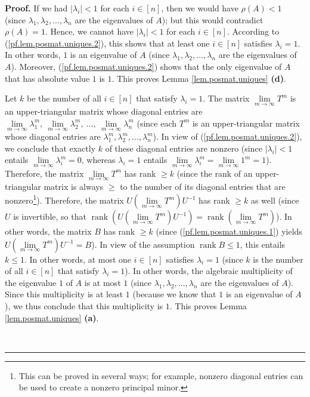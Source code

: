 \documentclass[numbers=enddot,12pt,final,onecolumn,notitlepage]{scrartcl}%
\numberwithin{exer}{subsection}
\theoremstyle{definition}
\newenvironment{proof}[1][Proof]{\noindent\textbf{#1.} }{\ \rule{0.5em}{0.5em}}
\begin{document}
\begin{proof}
If we had $\left\vert \lambda_{i}\right\vert <1$ for each $i\in\left[
n\right]  $, then we would have $\rho\left(  A\right)  <1$ (since $\lambda
_{1},\lambda_{2},\ldots,\lambda_{n}$ are the eigenvalues of $A$); but this
would contradict $\rho\left(  A\right)  =1$. Hence, we cannot have $\left\vert
\lambda_{i}\right\vert <1$ for each $i\in\left[  n\right]  $. According to
(\ref{pf.lem.posmat.uniques.2}), this shows that at least one $i\in\left[
n\right]  $ satisfies $\lambda_{i}=1$. In other words, $1$ is an eigenvalue of
$A$ (since $\lambda_{1},\lambda_{2},\ldots,\lambda_{n}$ are the eigenvalues of
$A$). Moreover, (\ref{pf.lem.posmat.uniques.2}) shows that the only eigenvalue
of $A$ that has absolute value $1$ is $1$. This proves Lemma
\ref{lem.posmat.uniques} \textbf{(d)}.

Let $k$ be the number of all $i\in\left[  n\right]  $ that satisfy
$\lambda_{i}=1$. The matrix $\lim\limits_{m\rightarrow\infty}T^{m}$ is an
upper-triangular matrix whose diagonal entries are $\lim\limits_{m\rightarrow
\infty}\lambda_{1}^{m},\ \lim\limits_{m\rightarrow\infty}\lambda_{2}%
^{m},\ \ldots,\ \lim\limits_{m\rightarrow\infty}\lambda_{n}^{m}$ (since each
$T^{m}$ is an upper-triangular matrix whose diagonal entries are $\lambda
_{1}^{m},\lambda_{2}^{m},\ldots,\lambda_{n}^{m}$). In view of
(\ref{pf.lem.posmat.uniques.2}), we conclude that exactly $k$ of these
diagonal entries are nonzero (since $\left\vert \lambda_{i}\right\vert <1$
entails $\lim\limits_{m\rightarrow\infty}\lambda_{i}^{m}=0$, whereas
$\lambda_{i}=1$ entails $\lim\limits_{m\rightarrow\infty}\lambda_{i}^{m}%
=\lim\limits_{m\rightarrow\infty}1^{m}=1$). Therefore, the matrix
$\lim\limits_{m\rightarrow\infty}T^{m}$ has rank $\geq k$ (since the rank of
an upper-triangular matrix is always $\geq$ to the number of its diagonal
entries that are nonzero\footnote{This can be proved in several ways; for
example, nonzero diagonal entries can be used to create a nonzero principal
minor.}). Therefore, the matrix $U\left(  \lim\limits_{m\rightarrow\infty
}T^{m}\right)  U^{-1}$ has rank $\geq k$ as well (since $U$ is invertible, so
that $\operatorname*{rank}\left(  U\left(  \lim\limits_{m\rightarrow\infty
}T^{m}\right)  U^{-1}\right)  =\operatorname*{rank}\left(  \lim
\limits_{m\rightarrow\infty}T^{m}\right)  $). In other words, the matrix $B$
has rank $\geq k$ (since (\ref{pf.lem.posmat.uniques.1}) yields $U\left(
\lim\limits_{m\rightarrow\infty}T^{m}\right)  U^{-1}=B$). In view of the
assumption $\operatorname*{rank}B\leq1$, this entails $k\leq1$. In other
words, at most one $i\in\left[  n\right]  $ satisfies $\lambda_{i}=1$ (since
$k$ is the number of all $i\in\left[  n\right]  $ that satisfy $\lambda_{i}%
=1$). In other words, the algebraic multiplicity of the eigenvalue $1$ of $A$
is at most $1$ (since $\lambda_{1},\lambda_{2},\ldots,\lambda_{n}$ are the
eigenvalues of $A$). Since this multiplicity is at least $1$ (because we know
that $1$ is an eigenvalue of $A$), we thus conclude that this multiplicity is
$1$. This proves Lemma \ref{lem.posmat.uniques} \textbf{(a)}.


\end{proof}
\end{document}
